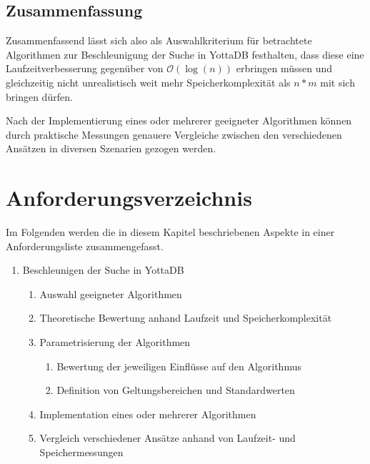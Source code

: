 \documentclass[oneside]{ausarbeitung}
\begin{document}
	
	
\subsection{Zusammenfassung}
	
Zusammenfassend lässt sich also als Auswahlkriterium für betrachtete Algorithmen zur Beschleunigung der Suche in YottaDB festhalten, dass diese eine Laufzeitverbesserung gegenüber von $\mathcal{O}(\log(n))$ erbringen müssen und gleichzeitig nicht unrealistisch weit mehr Speicherkomplexität als $n*m$ mit sich bringen dürfen.
	
Nach der Implementierung eines oder mehrerer geeigneter Algorithmen können durch praktische Messungen genauere Vergleiche zwischen den verschiedenen Ansätzen in diversen Szenarien gezogen werden. 
	
	
	
	
	
	
\section{Anforderungsverzeichnis}

Im Folgenden werden die in diesem Kapitel beschriebenen Aspekte in einer Anforderungsliste zusammengefasst. 
	
\begin{enumerate}
	\item Beschleunigen der Suche in YottaDB
	\begin{enumerate}
		\item Auswahl geeigneter Algorithmen 
		\item Theoretische Bewertung anhand Laufzeit und Speicherkomplexität
		\item Parametrisierung der Algorithmen 
		\begin{enumerate}
			\item Bewertung der jeweiligen Einflüsse auf den Algorithmus
			\item Definition von Geltungsbereichen und Standardwerten
		\end{enumerate}
		\item Implementation eines oder mehrerer Algorithmen
		\item Vergleich verschiedener Ansätze anhand von Laufzeit- und Speichermessungen
	\end{enumerate}

\end{enumerate}
\end{document}

